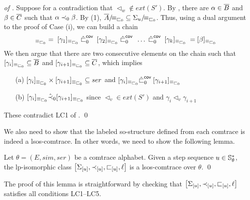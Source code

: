 \documentclass{llncs}
\begin{document}
\begin{proof}[of ]
Suppose for a contradiction that $\lhd_w \not\in ext(S')$. By , there are $\alpha\in \overline{B}$  and $\beta \in \overline{C}$ such that $\alpha \prec_{0} \beta$. By   (1), ${\overline{A}}/\!{\equiv_{\sqsubset_{0}}} \subseteq {\Sigma_{u}}/\!{\equiv_{\sqsubset_{0}}}$. Thus, using a dual argument to the proof of Case (i), we can build a chain
\begin{align}
[\alpha]_{\equiv_{\sq_{0}}}=\; [\gamma_1]_{\equiv_{\sq_{0}}} \;\imm{\hat{\sq}_{0}}\; [\gamma_2]_{\equiv_{\sq_{0}}}\;\imm{\hat{\sq}_{0}}\; \ldots\;\imm{\hat{\sq}_{0}}\;[\gamma_k]_{\equiv_{\sq_{0}}}\;= [\beta]_{\equiv_{\sq_{0}}} 
\end{align}
We then argue that there are two consecutive elements on the chain such that $[\gamma_i]_{\equiv_{\sqsubset_{0}}}\subseteq \overline{B}$ and $[\gamma_{i+1}]_{\equiv_{\sqsubset_{0}}}\subseteq \overline{C}$, which implies 
\begin{enumerate}
 \item[(a)] $[\gamma_{i}]_{\equiv_{\sqsubset_{0}}}\times [\gamma_{i+1}]_{\equiv_{\sqsubset_{0}}}\subseteq ser$ and $[\gamma_i]_{\equiv_{\sqsubset_{0}}} {\hat{\sqsubset}_{0}}^{\mathsf{cov}\;} [\gamma_{i+1}]_{\equiv_{\sqsubset_{0}}}$
 \item[(b)] $[\gamma_i]_{\equiv_{\sqsubset_{0}}} \hat{\prec}_{0} [\gamma_{i+1}]_{\equiv_{\sqsubset_{0}}}$ since $\lhd_v\in ext(S')$ and $\gamma_i \lhd_v \gamma_{i+1}$
\end{enumerate}
These contradict  \textsf{LC1} of . \qed

\end{proof}


We also need to show that the labeled so-structure defined from each comtrace is indeed a lsos-comtrace. In other words, we need to show the following lemma.

\begin{lemma}  Let $\theta=(E,sim,ser)$ be a comtrace alphabet. Given a step sequence  $u \in \mathbb{S}_{\theta}^{*}$, the lp-isomorphic class $\left[ \Sigma_{[u]},\prec_{[u]},\sqsubset_{[u]},\ell \right]$ is a lsos-comtrace over $\theta$. \qed
\label{lem:l3}
\end{lemma}

The proof of this lemma is straightforward by checking that $\left[ \Sigma_{[u]},\prec_{[u]},\sqsubset_{[u]},\ell \right]$ satisfies all conditions \textsf{LC1}--\textsf{LC5}.
\end{document}
